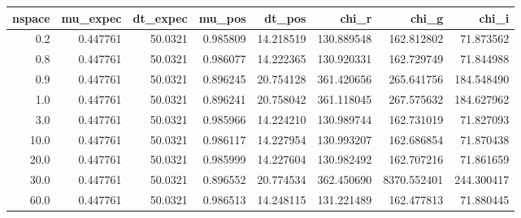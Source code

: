\begin{tabular}{rrrrrrrr}
\toprule
 nspace &  mu\_expec &  dt\_expec &    mu\_pos &     dt\_pos &       chi\_r &        chi\_g &       chi\_i \\
\midrule
    0.2 &  0.447761 &   50.0321 &  0.985809 &  14.218519 &  130.889548 &   162.812802 &   71.873562 \\
    0.8 &  0.447761 &   50.0321 &  0.986077 &  14.222365 &  130.920331 &   162.729749 &   71.844988 \\
    0.9 &  0.447761 &   50.0321 &  0.896245 &  20.754128 &  361.420656 &   265.641756 &  184.548490 \\
    1.0 &  0.447761 &   50.0321 &  0.896241 &  20.758042 &  361.118045 &   267.575632 &  184.627962 \\
    3.0 &  0.447761 &   50.0321 &  0.985966 &  14.224210 &  130.989744 &   162.731019 &   71.827093 \\
   10.0 &  0.447761 &   50.0321 &  0.986117 &  14.227954 &  130.993207 &   162.686854 &   71.870438 \\
   20.0 &  0.447761 &   50.0321 &  0.985999 &  14.227604 &  130.982492 &   162.707216 &   71.861659 \\
   30.0 &  0.447761 &   50.0321 &  0.896552 &  20.774534 &  362.450690 &  8370.552401 &  244.300417 \\
   60.0 &  0.447761 &   50.0321 &  0.986513 &  14.248115 &  131.221489 &   162.477813 &   71.880445 \\
\bottomrule
\end{tabular}
